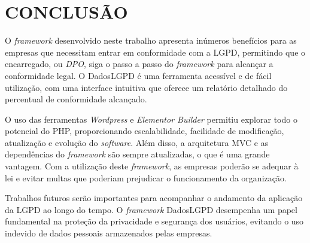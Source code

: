 \documentclass[
	12pt,				%
	openright,			%
	oneside,			%
	a4paper,			%
	english,			%
	french,				%
	spanish,			%
	brazil,				%
	]{abntex2}
\begin{document}
 \chapter{CONCLUSÃO}
 \label{ch: conclusao}
O \textit{framework} desenvolvido neste trabalho apresenta inúmeros benefícios para as empresas que necessitam entrar em conformidade com a LGPD, permitindo que o encarregado, ou \textit{DPO}, siga o passo a passo do \textit{framework} para alcançar a conformidade legal. O DadosLGPD é uma ferramenta acessível e de fácil utilização, com uma interface intuitiva que oferece um relatório detalhado do percentual de conformidade alcançado.

O uso das ferramentas \textit{Wordpress} e \textit{Elementor Builder} permitiu explorar todo o potencial do PHP, proporcionando escalabilidade, facilidade de modificação, atualização e evolução do \textit{software}. Além disso, a arquitetura MVC e as dependências do \textit{framework} são sempre atualizadas, o que é uma grande vantagem. Com a utilização deste \textit{framework}, as empresas poderão se adequar à lei e evitar multas que poderiam prejudicar o funcionamento da organização.

Trabalhos futuros serão importantes para acompanhar o andamento da aplicação da LGPD ao longo do tempo. O \textit{framework} DadosLGPD desempenha um papel fundamental na proteção da privacidade e segurança dos usuários, evitando o uso indevido de dados pessoais armazenados pelas empresas.




% 

\postextual




%
%
\end{document}
